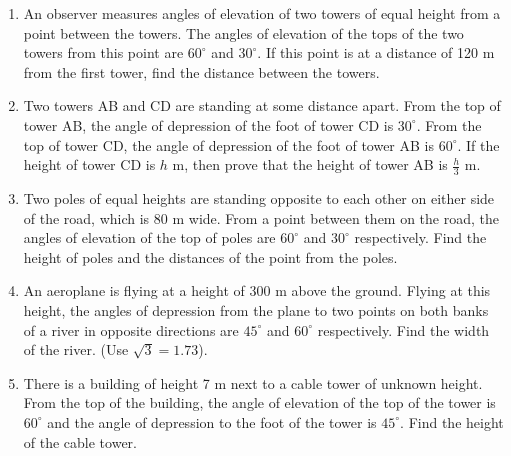 \documentclass{article}
\begin{document}
\begin{enumerate}
	\item An observer measures angles of elevation of two towers of equal height from a point between the towers. The angles of elevation of the tops of the two towers from this point are $60^\circ$ and $30^\circ$. If this point is at a distance of 120 m from the first tower, find the distance between the towers.
	
	\item Two towers AB and CD are standing at some distance apart. From the top of tower AB, the angle of depression of the foot of tower CD is $30^\circ$. From the top of tower CD, the angle of depression of the foot of tower AB is $60^\circ$. If the height of tower CD is $h$ m, then prove that the height of tower AB is $\frac{h}{3}$ m.
	
	\item Two poles of equal heights are standing opposite to each other on either side of the road, which is 80 m wide. From a point between them on the road, the angles of elevation of the top of poles are $60^\circ$ and $30^\circ$ respectively. Find the height of poles and the distances of the point from the poles.
	
	\item An aeroplane is flying at a height of 300 m above the ground. Flying at this height, the angles of depression from the plane to two points on both banks of a river in opposite directions are $45^\circ$ and $60^\circ$ respectively. Find the width of the river. (Use $\sqrt{3} = 1.73$).
	
	\item There is a building of height 7 m next to a cable tower of unknown height. From the top of the building, the angle of elevation of the top of the tower is $60^\circ$ and the angle of depression to the foot of the tower is $45^\circ$. Find the height of the cable tower.
\end{enumerate}







	
	\center{\large{************************************}}
	
\end{document}
